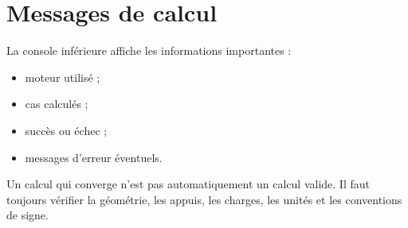 \section{Messages de calcul}

La console inférieure affiche les informations importantes :

\begin{itemize}
  \item moteur utilisé ;
  \item cas calculés ;
  \item succès ou échec ;
  \item messages d'erreur éventuels.
\end{itemize}

\begin{warningbox}
Un calcul qui converge n'est pas automatiquement un calcul valide. Il faut
toujours vérifier la géométrie, les appuis, les charges, les unités et les
conventions de signe.
\end{warningbox}
